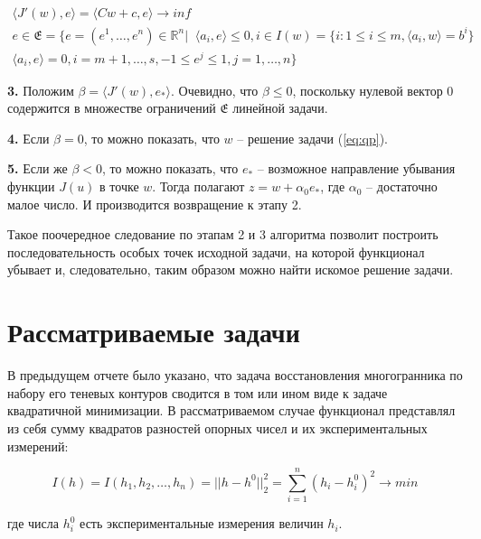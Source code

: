 \documentclass[a4paper, 12pt, titlepage]{article}
\theoremstyle{definition}
\theoremstyle{plain}
\theoremstyle{plain}
\begin{document}
\begin{equation}
 \begin{aligned}
 \langle J'(w), e \rangle = \langle C w + c, e \rangle \to inf \\
 e \in \mathfrak{E} = \{e = (e^{1}, \ldots, e^{n}) \in \mathbb{R}^{n} | \;\;
 \langle a_{i}, e \rangle \leq 0, i \in I(w) = \{i: 1 \leq i \leq m,
 \langle a_{i}, w \rangle = b^{i}\} \\
 \langle a_{i}, e \rangle = 0, i = m + 1, \ldots, s, -1 \leq e^{j} \leq 1,
 j = 1, \ldots, n\}
 \end{aligned}
\end{equation}

\textbf{3.} Положим $\beta = \langle J'(w), e_{*} \rangle$. Очевидно, что
$\beta \leq 0$, поскольку нулевой вектор $0$ содержится в множестве
ограничений $\mathfrak{E}$ линейной задачи.

\textbf{4.} Если $\beta = 0$, то можно показать, что $w$ -- решение задачи
(\ref{eq:qp}).

\textbf{5.} Если же $\beta < 0$, то можно показать, что $e_{*}$ -- возможное
направление убывания функции $J(u)$ в точке $w$. Тогда полагают
$z = w + \alpha_{0} e_{*}$, где $\alpha_{0}$ -- достаточно малое число. И
производится возвращение к этапу 2.

Такое поочередное следование по этапам 2 и 3 алгоритма позволит 
построить последовательность особых точек исходной задачи, на которой 
функционал убывает и, следовательно, таким образом можно найти искомое решение
задачи.





\section{Рассматриваемые задачи}
\label{sec:problem}

В предыдущем отчете было указано, что задача восстановления многогранника по
набору его теневых контуров сводится в том или ином виде к задаче квадратичной
минимизации. В рассматриваемом случае функционал представлял из себя сумму
квадратов разностей опорных чисел и их экспериментальных измерений:

\begin{equation}
\label{eq:problem1}
 I(h) = I(h_{1}, h_{2}, \ldots, h_{n}) = ||h - h^{0}||_{2}^{2} =
 \sum \limits_{i = 1}^{n} (h_{i} - h_{i}^{0})^{2} \to min
\end{equation}

где числа $h_{i}^{0}$ есть экспериментальные измерения величин $h_{i}$.
\end{document}

